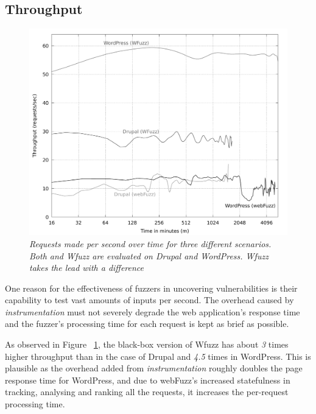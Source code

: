 \subsection{Throughput}

\begin{figure}[!htb]
  \centering \includegraphics[width=\linewidth]{figures/plot_throughput.pdf}
  \captionsetup{justification=centering}  
  \caption[Throughput of \pname{} and Wfuzz when fuzzing Drupal and WordPress]{\textit{Requests made per second over time for three different scenarios. Both \pname{} and Wfuzz are evaluated on Drupal and WordPress. Wfuzz takes the lead with a difference}} 
  \label{fig:plot_throughput}
\end{figure}

One reason for the effectiveness of fuzzers in uncovering vulnerabilities is their capability to test vast amounts of inputs per second. The overhead caused by \emph{instrumentation} must not severely degrade the web application's response time and the fuzzer's processing time for each request is kept as brief as possible.

As observed in Figure ~\ref{fig:plot_throughput}, the black-box version of Wfuzz has about \emph{3} times higher throughput than \pname{} in the case of Drupal and \emph{4.5} times in WordPress. This is plausible as the overhead added from \emph{instrumentation} roughly doubles the page response time for WordPress, and due to webFuzz's increased statefulness in tracking, analysing and ranking all the requests, it increases the per-request processing time.

